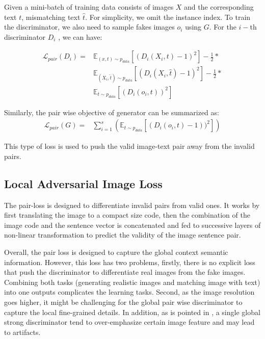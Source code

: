 \documentclass[10pt,twocolumn,letterpaper]{article}
\begin{document}
Given a mini-batch of training data consists of images $X$ and the corresponding text $t$, mismatching text $\hat{t}$. For simplicity, we omit the instance index.  To train the discriminator,  we also need to sample fakes images $o_i$ using $G$. For the $i-$th discriminator $D_i$ , we can have:

\begin{equation}
\label{equ:matchignloss}
\begin{split}
\mathcal{L}_{pair}(D_i)  = & \mathbb{E}_{(x, t) \sim p_{data}}[(D_i( {X_i},  {t}) - 1) ^ 2 ] - \frac{1}{2}*\\ 
&   \mathbb{E}_{(X_i, \hat{t}) \sim p_{data}}[(D_i({X_i}, \hat{{t}}) - 1)^2  ] - \frac{1}{2} *\\
&   \mathbb{E}_{t \sim p_{data}}[ (D_i( {o}_i, {t}))^2 ]  
\end{split}
\end{equation}

Similarly, the pair wise objective of generator can be summarized as:
\begin{equation}
\label{equ:pariG}
\begin{split}
\mathcal{L}_{pair}(G)  = & \sum_{i=1}^{s} ( \mathbb{E}_{t \sim p_{data}}[ (D_i( {o}_i, {t}) - 1) )^2 ] )
\end{split}
\end{equation}

This type of loss is used to push the valid image-text pair away from the invalid pairs.

\subsection{Local Adversarial Image Loss}

The pair-loss is designed to differentiate invalid pairs from valid ones.
It works by first translating the image to a compact size code, then the combination of the image code and the sentence vector is concatenated and fed to successive layers of non-linear transformation  to predict the validity of the image sentence pair. 

Overall, the pair loss is designed to capture the global context semantic information.  However, this loss has two problems, firstly,  there is no explicit loss that push the discriminator to differentiate real images from the fake images. Combining both tasks (generating realistic images and matching image with text) into one outputs complicates the learning tasks. Second,  as the image resolution goes higher, it might be challenging for the global pair wise discriminator to capture the local fine-grained details.  In addition, as is pointed in \cite{shrivastava2016learning}, a single global strong discriminator tend to over-emphasize certain image feature and may lead to artifacts. 
\end{document}
